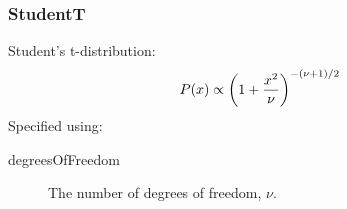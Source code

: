 \subsubsection{{\normalfont \ttfamily StudentT}}

Student's t-distribution:
\begin{equation}
P(x) \propto \left(1 + {x^2\over \nu}\right)^{-(\nu+1)/2}
\end{equation}
Specified using:
\begin{description}
\item[{\normalfont \ttfamily degreesOfFreedom}] The number of degrees of freedom, $\nu$.
\end{description}
